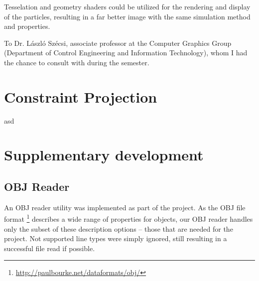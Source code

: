 \documentclass[sigplan,screen,nonacm]{acmart}
\begin{document}
Tesselation and geometry shaders could be utilized for the rendering and display
of the particles, resulting in a far better image with the same simulation
method and properties.

\begin{acks}
    To Dr. László Szécsi, associate professor at the Computer Graphics Group
    (Department of Control Engineering and Information Technology), whom I had
    the chance to consult with during the semester.
\end{acks}




\appendix

\section{Constraint Projection} \label{appendix:ConstraintProjection}
asd


\section{Supplementary development}

\subsection{OBJ Reader}
\label{section:appendixOBJ}

An OBJ reader utility was implemented as part of the project. As the OBJ file
format \footnote{\url{http://paulbourke.net/dataformats/obj/}} describes a wide range
of properties for objects, our OBJ reader handles only the subset of
these description options -- those that are needed for the project. Not
supported line types were simply ignored, still resulting in
a successful file read if possible.
\end{document}
